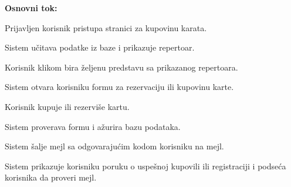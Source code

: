 \documentclass[a4paper]{article}
\begin{document}
\noindent\textbf{Osnovni tok:}
  \begin{legal}
    \item Prijavljen korisnik pristupa stranici za kupovinu karata. 
    \item Sistem učitava podatke iz baze i prikazuje repertoar.
    \item Korisnik klikom bira željenu predstavu sa prikazanog repertoara.
    \item Sistem otvara korisniku formu za rezervaciju ili kupovinu karte.
    \item Korisnik kupuje ili rezerviše kartu.
    \item Sistem proverava formu i ažurira bazu podataka.
    \item Sistem šalje mejl sa odgovarajućim kodom korisniku na mejl.
    \item Sistem prikazuje korisniku poruku o uspešnoj kupovili ili registraciji i podseća
          korisnika da proveri mejl.
  \end{legal}
\end{document}
